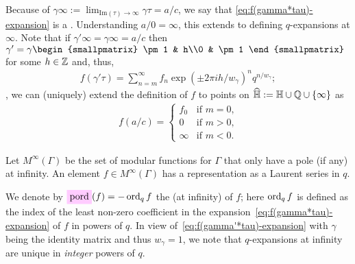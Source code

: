 \documentclass{article}
\begin{document}

Because of
$\gamma\infty:=\lim_{\mathrm{Im}{(\tau)}\to\infty}\gamma\tau = a/c$,
we say that \eqref{eq:f(gamma*tau)-expansion} is a
.
Understanding $a/0=\infty$, this extends to defining $q$-expansions at
$\infty$. Note that if $\gamma'\infty=\gamma\infty=a/c$ then
$\gamma'=\gamma
\begin{smallpmatrix}
  \pm 1 & h\\0 & \pm 1
\end{smallpmatrix}
$ for some $h \in \mathbb{Z}$ and, thus,
\begin{gather}
  \label{eq:f(gamma'*tau)-expansion}
  f(\gamma'\tau)
  =
  \sum_{n=m}^\infty f_n \exp(\pm 2\pi i h /w_\gamma)^n q^{n/w_\gamma};
\end{gather}
\ie, we can (uniquely) extend the definition of $f$ to points on
$\widehat{\mathbb{H}}:=\mathbb{H}\cup\mathbb{Q}\cup\left\{\infty\right\}$ as
\begin{gather*}
  f(a/c) =
  \begin{cases}
    f_0&\text{if $m=0$,}\\
    0&\text{if $m>0$,}\\
    \infty&\text{if $m<0$}.
  \end{cases}
\end{gather*}

Let $M^\infty(\Gamma)$ be the set of modular functions for $\Gamma$
that only have a pole (if any) at infinity.
%
An element $f\in M^\infty(\Gamma)$ has a representation as a Laurent
series in $q$.

We denote by $\defineNotation[pord]{\pord}(f)=-\ord_qf$ the
 (at infinity) of $f$; here $\operatorname{ord}_qf$ is
defined as the index of the least non-zero coefficient in the
expansion~\eqref{eq:f(gamma*tau)-expansion} of $f$ in powers of $q$.
In view of~\eqref{eq:f(gamma'*tau)-expansion} with $\gamma$ being the
identity matrix and thus $w_\gamma=1$, we note that $q$-expansions at
infinity are unique in \textit{integer} powers of $q$.
\end{document}
